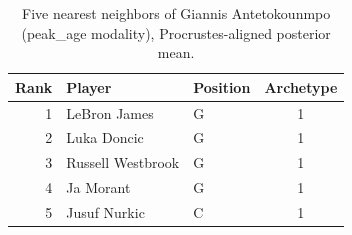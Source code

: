 \begin{table}[htbp]
  \centering\small
  \begin{tabular}{rllc}
    \toprule
    Rank & Player & Position & Archetype \\
    \midrule
    1 & LeBron James & G & 1 \\
    2 & Luka Doncic & G & 1 \\
    3 & Russell Westbrook & G & 1 \\
    4 & Ja Morant & G & 1 \\
    5 & Jusuf Nurkic & C & 1 \\
    \bottomrule
  \end{tabular}
  \caption{Five nearest neighbors of Giannis Antetokounmpo (peak_age modality), Procrustes-aligned posterior mean.}
  \label{tab:Giannis_Antetokounmpo_neighbors_peak_age}
\end{table}

